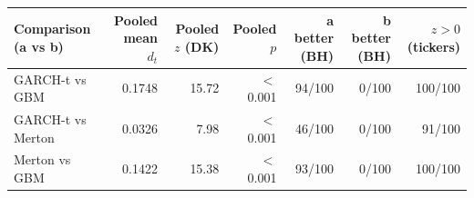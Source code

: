 \begin{tabular}{lrrrrrr}
\toprule
Comparison (a vs b) & Pooled mean $d_t$ & Pooled $z$ (DK) & Pooled $p$ & a better (BH) & b better (BH) & $z>0$ (tickers) \\
\midrule
GARCH-t vs GBM & 0.1748 & 15.72 & $<$0.001 & 94/100 & 0/100 & 100/100 \\
GARCH-t vs Merton & 0.0326 & 7.98 & $<$0.001 & 46/100 & 0/100 & 91/100 \\
Merton vs GBM & 0.1422 & 15.38 & $<$0.001 & 93/100 & 0/100 & 100/100 \\
\bottomrule
\end{tabular}
